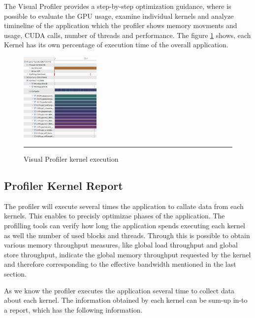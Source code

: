 The Visual Profiler provides a step-by-step optimization guidance, where is possible to evaluate the GPU usage, examine individual kernels and analyze timineline of the application which the profiler shows memory movments and usage, CUDA calls, number of threads and performance. The figure \ref{fig:visual01} shows, each Kernel has its own percentage of execution time of the overall application.\cite{practices}

\begin{figure}[htbp]
	\centering
		\includegraphics[width=0.35\textwidth]{Figures/visual01.png}
		\rule{35em}{0.5pt}
	\caption[Visual Profiler example]{Visual Profiler kernel execution}
	\label{fig:visual01}
\end{figure}

\subsection{Profiler Kernel Report}

The profiler will execute several times the application to callate data from each kernels. This enables to precisly optimizae phases of the application\cite{example}. The profilling tools can verify how long the application spends executing each kernel as well the number of used blocks and threads. Through this is possible to obtain various memory throughput measures, like global load throughput and global store throughput, indicate the global memory throughput requested by the kernel and therefore corresponding to the effective bandwidth mentioned in the last section.

As we know the profiler executes the application several time to collect data about each kernel. The information obtained by each kernel can be sum-up in-to a report, which has the following information.

